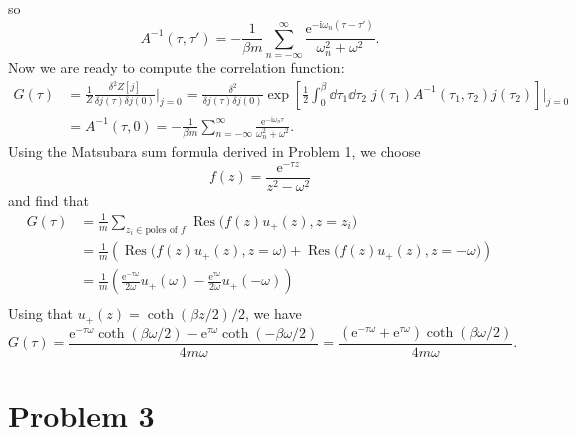 \documentclass{article}
\newcommand{\ii}{\mathrm{i}}
\newcommand{\me}{\mathrm{e}}
\begin{document}
so
\begin{equation}
    A^{-1}(\tau,\tau') = -\frac{1}{\beta m} \sum_{n=-\infty}^{\infty} \frac{\me^{-\ii \omega_n (\tau-\tau')}}{\omega_n^2 + \omega^2}.
\end{equation}
Now we are ready to compute the correlation function:
\begin{equation}
    \begin{split}
        G(\tau) & =\frac{1}{Z}\frac{\delta^2 Z[j]}{\delta j(\tau)\delta j(0)}\Bigg|_{j=0} = \frac{\delta^2}{\delta j(\tau)\delta j(0)} \exp\left[\frac{1}{2}\int_0^{\beta} \dd{\tau_1} \dd{\tau_2} \; j(\tau_1) A^{-1}(\tau_1,\tau_2) j(\tau_2)\right]\Bigg|_{j=0} \\
                & =A^{-1}(\tau,0) = -\frac{1}{\beta m} \sum_{n=-\infty}^{\infty} \frac{\me^{-\ii \omega_n \tau}}{\omega_n^2 + \omega^2}.
    \end{split}
\end{equation}
Using the Matsubara sum formula derived in Problem 1, we choose 
\begin{equation}
    f(z) = \frac{\me^{-\tau z}}{z^2 - \omega^2}
\end{equation}
and find that
\begin{equation}
    \begin{split}
        G(\tau) &= \frac{1}{m}\sum_{z_i\in\text{poles of }f} \operatorname*{Res}\big(f(z)u_+(z), z=z_i\big)\\
                &= \frac{1}{m}(\operatorname*{Res}\big(f(z)u_+(z), z=\omega\big) + \operatorname*{Res}\big(f(z)u_+(z), z=-\omega\big))\\
                &= \frac{1}{m}\left(\frac{\me^{-\tau \omega}}{2\omega}u_+(\omega) - \frac{\me^{\tau \omega}}{2\omega}u_+(-\omega)\right)\\
    \end{split}
\end{equation}
Using that $u_+(z)=\coth(\beta z/2)/2$, we have 
\begin{equation}
    G(\tau) = \frac{\me^{-\tau\omega}\coth(\beta\omega/2)-\me^{\tau\omega}\coth(-\beta\omega/2)}{4m\omega}=\frac{(\me^{-\tau\omega}+\me^{\tau\omega})\coth(\beta\omega/2)}{4m\omega}.
\end{equation}


\section*{Problem 3}
\end{document}
